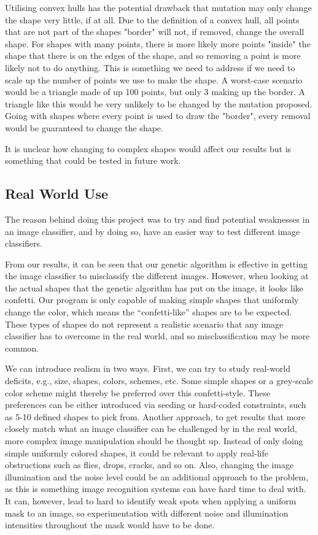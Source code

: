 \documentclass[conference]{IEEEtran}
\begin{document}
Utilising convex hulls has the potential drawback that mutation may only change the shape very little, if at all.
Due to the definition of a convex hull, all points that are not part of the shapes "border" will not, if removed, change the overall shape.
For shapes with many points, there is more likely more points "inside" the shape that there is on the edges of the shape, and so removing a point is more likely not to do anything.
This is something we need to address if we need to scale up the number of points we use to make the shape.
A worst-case scenario would be a triangle made of up 100 points, but only 3 making up the border.
A triangle like this would be very unlikely to be changed by the mutation proposed.
Going with shapes where every point is used to draw the "border", every removal would be guaranteed to change the shape. 

It is unclear how changing to complex shapes would affect our results but is something that could be tested in future work.

\subsection{Real World Use}
The reason behind doing this project was to try and find potential weaknesses in an image classifier, and by doing so, have an easier way to test different image classifiers.

From our results, it can be seen that our genetic algorithm is effective in getting the image classifier to misclassify the different images. However, when looking at the actual shapes that the genetic algorithm has put on the image, it looks like confetti.
Our program is only capable of making simple shapes that uniformly change the color, which means the “confetti-like” shapes are to be expected.
 These types of shapes do not represent a realistic scenario that any image classifier has to overcome in the real world, and so misclassification may be more common.

We can introduce realism in two ways.
First, we can try to study real-world deficits, e.g., size, shapes, colors, schemes, etc.
Some simple shapes or a grey-scale color scheme might thereby be preferred over this confetti-style.
These preferences can be either introduced via seeding or hard-coded constraints, such as 5-10 defined shapes to pick from.
Another approach, to get results that more closely match what an image classifier can be challenged by in the real world, more complex image manipulation should be thought up.
Instead of only doing simple uniformly colored shapes, it could be relevant to apply real-life obstructions such as flies, drops, cracks, and so on.
Also, changing the image illumination and the noise level could be an additional approach to the problem, as this is something image recognition systems can have hard time to deal with.
It can, however, lead to hard to identify weak spots when applying a uniform mask to an image, so experimentation with different noise and illumination intensities throughout the mask would have to be done.
\end{document}
